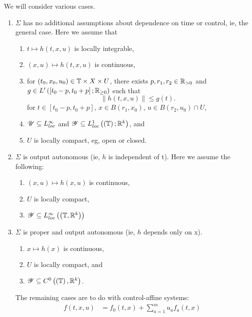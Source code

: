 We will consider various cases.
\begin{enumerate}
	\item $\Sigma $ has no additional assumptions about dependence on time or control, ie, the general case. Here we assume that 
		 \begin{enumerate}
			 \item $t \longmapsto h\left( t, x, u \right) $ is locally integrable, 
			 \item $\left( x, u \right) \longmapsto h\left( t, x, u \right) $ is continuous, 
			 \item for $\left( t_0 , x_0, u_0 \right) \in  \mathbb{T} \times X \times  U$, there exists $p, r_1, r_2 \in \mathbb{R}_{>0}$ and $g \in  L'\left( \left[ t_0 - p, t_0 + p  \right] ; \mathbb{R} _{\ge 0} \right) $ such that 
				  \[
					  \|h\left( t, x, u \right) \| \le  g\left( t \right) 
				 .\] 
				 for $t \in \left[ t_0 - p, t_0 + p \right] $, $x \in  B\left( r_1, x_0 \right) $, $u \in  B\left( r_2, u_0 \right) \cap U$, 
			 \item $\mathscr{U} \subseteq L^{\infty}_{loc}$ and $\mathscr{Y} \subseteq L^{1}_{loc}\left( \left( \mathbb{T} \right) ; \mathbb{R}^{k} \right) $, and 
			 \item $U$ is locally compact, eg, open or closed. 
		\end{enumerate}
	\item $\Sigma$ is output autonomous (ie, $h$ is independent of t). Here we assume the following:
		\begin{enumerate}
			\item $\left( x, u \right) \longmapsto h\left( x, u \right) $ is continuous, 
			\item $U$ is locally compact, 
			\item $\mathscr{Y} \subseteq L^{\infty}_{loc}\left( \left( \mathbb{T}, \mathbb{R}^{k} \right)  \right) $
		\end{enumerate}
	\item $\Sigma$ is proper and output autonomous (ie,  $h$ depends only on x).
		\begin{enumerate}
			\item $x \longmapsto h\left( x \right) $ is continuous, 
			\item $U$ is locally compact, and
			\item $\mathscr{Y} \subseteq C^{0}\left( \left( \mathbb{T} \right) , \mathbb{R}^{k} \right) $.
		\end{enumerate}
The remaining cases are to do with control-affine systems:
\begin{align*}
	f\left( t, x, u \right) &= f_0 \left( t, x \right)  + \sum_{a=1}^{m} u_{a}f_a \left( t, x \right)  \\

\end{align*}
\end{enumerate}
